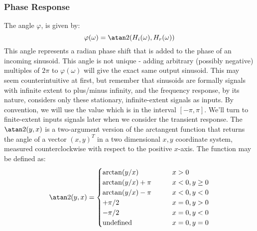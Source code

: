 \subsubsection{Phase Response} 
The angle $\varphi$, is given by:
\begin{equation}
 \varphi(\omega) = \atan2(H_i(\omega),H_r(\omega))
\end{equation} 
This angle represents a radian phase shift that is added to the phase of an incoming sinusoid. This angle is not unique - adding arbitrary (possibly negative) multiples of $2 \pi$ to $\varphi(\omega)$ will give the exact same output sinusoid. This may seem counterintuitive at first, but remember that sinusoids are formally signals with infinite extent to plus/minus infinity, and the frequency response, by its nature, considers only these stationary, infinite-extent signals as inputs. By convention, we will use the value which is in the interval $[-\pi, \pi]$. We'll turn to finite-extent inputs signals later when we consider the transient response. The $\atan2(y, x)$ is a two-argument version of the arctangent function that returns the angle of a vector $(x, y)^T$ in a two dimensional $x,y$ coordinate system, measured counterclockwise with respect to the positive $x$-axis. The function may be defined as:
\begin{equation}
 \atan2(y, x) = 
 \begin {cases}
 \arctan(y/x)       \qquad & x > 0           \\
 \arctan(y/x) + \pi \qquad & x < 0, y \geq 0 \\
 \arctan(y/x) - \pi \qquad & x < 0, y <    0 \\
 +\pi/2             \qquad & x = 0, y >    0 \\
 -\pi/2             \qquad & x = 0, y <    0 \\
 \text{undefined}   \qquad & x = 0, y =    0 \\
 \end{cases}
\end{equation} 
